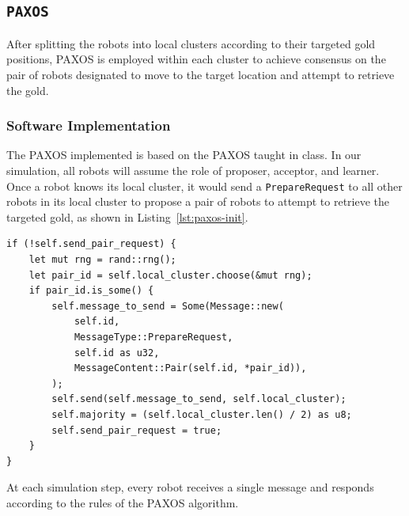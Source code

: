 \documentclass[12pt,a4paper]{article}
\begin{document}
\subsection{\texttt{PAXOS}}
After splitting the robots into local clusters according to their targeted gold positions, PAXOS is employed within each cluster to achieve consensus on the pair of robots designated to move to the target location and attempt to retrieve the gold.

\subsubsection{Software Implementation}
The PAXOS implemented is based on the PAXOS taught in class. In our simulation, all robots will assume the role of proposer, acceptor, and learner. Once a robot knows its local cluster, it would send a \texttt{PrepareRequest} to all other robots in its local cluster to propose a pair of robots to attempt to retrieve the targeted gold, as shown in Listing~\ref{lst:paxos-init}.
\begin{lstlisting}[float, caption={Robot Sends a \texttt{PrepareRequest} to Propose a Robot Pairing}, label={lst:paxos-init}]
if (!self.send_pair_request) {
    let mut rng = rand::rng();
    let pair_id = self.local_cluster.choose(&mut rng);
    if pair_id.is_some() {
        self.message_to_send = Some(Message::new(
            self.id,
            MessageType::PrepareRequest,
            self.id as u32,
            MessageContent::Pair(self.id, *pair_id)),
        );
        self.send(self.message_to_send, self.local_cluster);
        self.majority = (self.local_cluster.len() / 2) as u8;
        self.send_pair_request = true;
    }
}
\end{lstlisting}
At each simulation step, every robot receives a single message and responds according to the rules of the PAXOS algorithm. 
\end{document}
